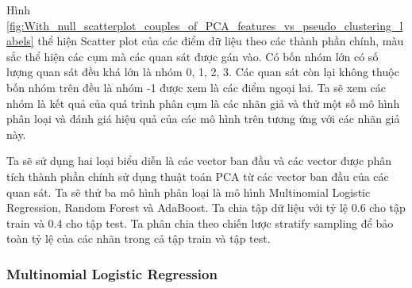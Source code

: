 Hình \ref{fig:With_null_scatterplot_couples_of_PCA_features_vs_pseudo_clustering_labels} thể hiện Scatter plot của các điểm dữ liệu theo các thành phần chính, màu sắc thể hiện các cụm mà các quan sát được gán vào.
Có bốn nhóm lớn có số lượng quan sát đều khá lớn là nhóm 0, 1, 2, 3.
Các quan sát còn lại không thuộc bốn nhóm trên đều là nhóm -1 được xem là các điểm ngoại lai.
Ta sẽ xem các nhóm là kết quả của quá trình phân cụm là các nhãn giả và thử một số mô hình phân loại và đánh giá hiệu quả của các mô hình trên tương ứng với các nhãn giả này.

Ta sẽ sử dụng hai loại biểu diễn là các vector ban đầu và các vector được phân tích thành phần chính sử dụng thuật toán PCA từ các vector ban đầu của các quan sát.
Ta sẽ thử ba mô hình phân loại là mô hình Multinomial Logistic Regression, Random Forest và AdaBoost.
Ta chia tập dữ liệu với tỷ lệ 0.6 cho tập train và 0.4 cho tập test.
Ta phân chia theo chiến lược stratify sampling để bảo toàn tỷ lệ của các nhãn trong cả tập train và tập test.

\subsubsection{Multinomial Logistic Regression}

